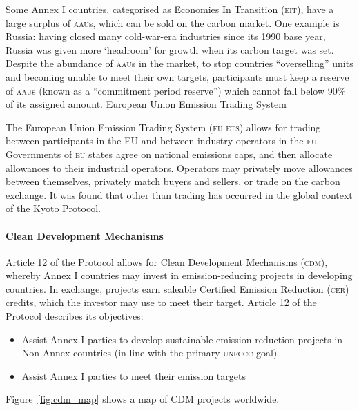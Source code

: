 \documentclass[]{article} %
\begin{document}
Some Annex I countries, categorised as Economies In Transition (\textsc{eit}), have a large surplus of \textsc{aau}s, which can be sold on the carbon market. One example is Russia: having closed many cold-war-era industries since its 1990 base year, Russia was given more ‘headroom’ for growth when its carbon target was set. Despite the abundance of \textsc{aau}s in the market, to stop countries “overselling” units and becoming unable to meet their own targets, participants must keep a reserve of \textsc{aau}s (known as a “commitment period reserve”) which cannot fall below 90\% of its assigned amount.
European Union Emission Trading System

The European Union Emission Trading System (\textsc{eu ets}) allows for trading between participants in the EU and between industry operators in the \textsc{eu}. Governments of \textsc{eu} states agree on national emissions caps, and then allocate allowances to their industrial operators. Operators may privately move allowances between themselves, privately match buyers and sellers, or trade on the carbon exchange. It was found that other than trading has occurred in the global context of the Kyoto Protocol.~\cite{Grubb-09}

\paragraph{Clean Development Mechanisms}

Article 12 of the Protocol allows for Clean Development Mechanisms (\textsc{cdm}), whereby Annex I countries may invest in emission-reducing projects in developing countries. In exchange, projects earn saleable Certified Emission Reduction (\textsc{cer}) credits, which the investor may use to meet their target. Article 12 of the Protocol describes its objectives:

\begin{itemize}
	\item Assist Annex I parties to develop sustainable emission-reduction projects in Non-Annex countries (in line with the primary \textsc{unfccc} goal)
	\item Assist Annex I parties to meet their emission targets
\end{itemize}

Figure~\ref{fig:cdm_map} shows a map of CDM projects worldwide.
\end{document}
